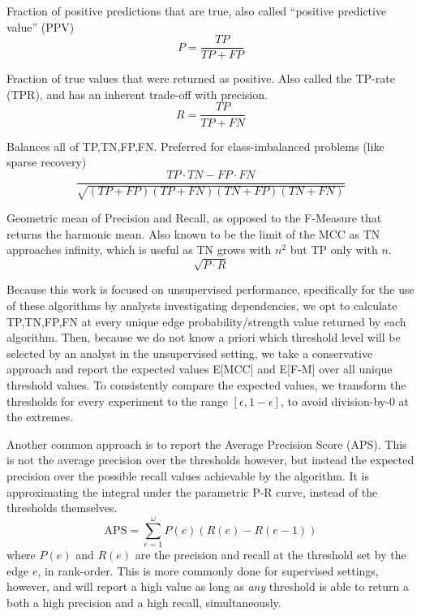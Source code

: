\documentclass[%
	12pt,
		oneside,
		letterpaper
]{book}
\providecommand{\tightlist}{%
  \setlength{\itemsep}{0pt}\setlength{\parskip}{0pt}}\usepackage{longtable,booktabs,array}
\begin{document}
\begin{description}
\tightlist
\item[Precision (P)]
Fraction of positive predictions that are true, also called ``positive
predictive value'' (PPV) \[P= \frac{TP}{TP+FP}\]
\item[Recall (R)]
Fraction of true values that were returned as positive. Also called the
TP-rate (TPR), and has an inherent trade-off with precision.
\[R=\frac{TP}{TP+FN} \]
\item[Matthews Correlation Coefficient (MCC)]
Balances all of TP,TN,FP,FN. Preferred for class-imbalanced problems
(like sparse recovery)
\autocite{statisticalcomparisonMatthews_Chicco2023}
\[\frac{TP\cdot TN - FP\cdot FN}{\sqrt{(TP+FP)(TP+FN)(TN+FP)(TN+FN)}}\]
\item[Fowlkes-Mallows (F-M)]
Geometric mean of Precision and Recall, as opposed to the F-Measure that
returns the harmonic mean. Also known to be the limit of the MCC as TN
approaches infinity\autocite{MCCapproachesgeometric_Crall2023}, which is
useful as TN grows with \(n^2\) but TP only with \(n\).
\[\sqrt{P\cdot R}\]
\end{description}

Because this work is focused on unsupervised performance, specifically
for the use of these algorithms by analysts investigating dependencies,
we opt to calculate TP,TN,FP,FN at every unique edge
probability/strength value returned by each algorithm. Then, because we
do not know a priori which threshold level will be selected by an
analyst in the unsupervised setting, we take a conservative approach and
report the expected values E{[}MCC{]} and E{[}F-M{]} over all unique
threshold values. To consistently compare the expected values, we
transform the thresholds for every experiment to the range
\([\epsilon, 1-\epsilon]\), to avoid division-by-0 at the extremes.

Another common approach is to report the Average Precision Score (APS).
This is not the average precision over the thresholds however, but
instead the expected precision over the possible recall values
achievable by the algorithm. It is approximating the integral under the
parametric P-R curve, instead of the thresholds themselves.
\[\text{APS} = \sum_{e=1}^{\omega} P(e)(R(e)-R(e-1))\] where \(P(e)\)
and \(R(e)\) are the precision and recall at the threshold set by the
edge \(e\), in rank-order. This is more commonly done for supervised
settings, however, and will report a high value as long as \emph{any}
threshold is able to return a both a high precision and a high recall,
simultaneously.
\end{document}
